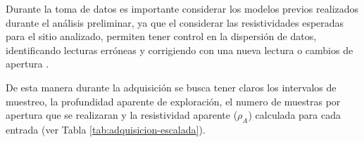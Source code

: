 			Durante la toma de datos es importante considerar los modelos previos realizados durante el análisis preliminar, ya que el considerar las resistividades esperadas para el sitio analizado, permiten tener control en la dispersión de datos, identificando lecturas erróneas y corrigiendo con una nueva lectura o cambios de apertura \citep{telford1990}.
			
			
			De esta manera durante la adquisición se busca tener claros los intervalos de muestreo, la profundidad aparente de exploración, el numero de muestras por apertura que se realizaran y la resistividad aparente ($\rho _{A}$) calculada para cada entrada (ver Tabla \ref{tab:adquisicion-escalada}). 
	
						
						\begin{table}[h!] %
							\centering
							\caption{Ejemplo de un registro de adquisición de SEV.}
							\label{tab:adquisicion-escalada}
							

\end{table}
